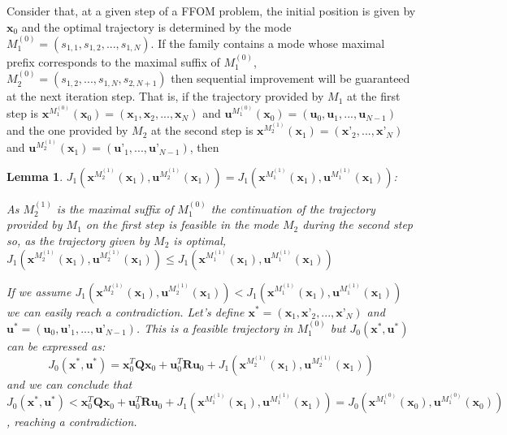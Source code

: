 \documentclass[12,twoside]{TFG-GM}
\newtheorem{lemma}[theorem]{Lemma}
\theoremstyle{definition}
\theoremstyle{remark}
\begin{document}
Consider that, at a given step of a FFOM problem, the initial position is given by $\textbf{x}_0$ and the optimal trajectory is determined by the mode $M_1^{(0)} = (s_{1,1}, s_{1,2}, ..., s_{1,N})$. If the family contains a mode whose maximal prefix corresponds to the maximal suffix of $M_1^{(0)}$, $M_2^{(0)} = (s_{1,2}, ..., s_{1,N}, s_{2,N+1} )$ then sequential improvement will be guaranteed at the next iteration step. That is, if the trajectory provided by $M_1$ at the first step is $\textbf{x}^{M_1^{(0)}}(\textbf{x}_0) = (\textbf{x}_1, \textbf{x}_2, ..., \textbf{x}_N)$ and $\textbf{u}^{M_1^{(0)}}(\textbf{x}_0) = (\textbf{u}_0, \textbf{u}_1, ..., \textbf{u}_{N-1})$ and the one provided by $M_2$ at the second step is $\textbf{x}^{M_2^{(1)}}(\textbf{x}_1) = (\textbf{x'}_2, ..., \textbf{x'}_N)$ and $\textbf{u}^{M_2^{(1)}}(\textbf{x}_1) = (\textbf{u'}_1, ..., \textbf{u'}_{N-1})$, then

\begin{lemma} \label{lem:seq_imp} {$J_1(\textbf{x}^{M_2^{(1)}}(\textbf{x}_1),\textbf{u}^{M_2^{(1)}}(\textbf{x}_1)) = J_1(\textbf{x}^{M_1^{(1)}}(\textbf{x}_1),\textbf{u}^{M_1^{(1)}}(\textbf{x}_1))$:}


As $M_2^{(1)}$ is the maximal suffix of $M_1^{(0)}$ the continuation of the trajectory provided by $M_1$ on the first step is feasible in the mode $M_2$ during the second step so, as the trajectory given by $M_2$ is optimal, $J_1(\textbf{x}^{M_2^{(1)}}(\textbf{x}_1),\textbf{u}^{M_2^{(1)}}(\textbf{x}_1)) \leq J_1(\textbf{x}^{M_1^{(1)}}(\textbf{x}_1),\textbf{u}^{M_1^{(1)}}(\textbf{x}_1))$

If we assume $J_1(\textbf{x}^{M_2^{(1)}}(\textbf{x}_1),\textbf{u}^{M_2^{(1)}}(\textbf{x}_1)) < J_1(\textbf{x}^{M_1^{(1)}}(\textbf{x}_1),\textbf{u}^{M_1^{(1)}}(\textbf{x}_1))$ we can easily reach a contradiction. Let's define $\textbf{x}^* = (\textbf{x}_1, \textbf{x'}_2, ..., \textbf{x'}_N)$ and $\textbf{u}^* = (\textbf{u}_0, \textbf{u'}_1, ..., \textbf{u'}_{N-1} )$. This is a feasible trajectory in $M_1^{(0)}$ but $J_0(\textbf{x}^*, \textbf{u}^*)$ can be expressed as: $$J_0(\textbf{x}^*, \textbf{u}^*) = \textbf{x}_0^T \textbf{Q} \textbf{x}_0 + \textbf{u}_0^T \textbf{R} \textbf{u}_0 + J_1(\textbf{x}^{M_2^{(1)}}(\textbf{x}_1),\textbf{u}^{M_2^{(1)}}(\textbf{x}_1))$$ and we can conclude that $J_0(\textbf{x}^*, \textbf{u}^*) < \textbf{x}_0^T \textbf{Q} \textbf{x}_0 + \textbf{u}_0^T \textbf{R} \textbf{u}_0 + J_1(\textbf{x}^{M_1^{(1)}}(\textbf{x}_1),\textbf{u}^{M_1^{(1)}}(\textbf{x}_1)) = J_0(\textbf{x}^{M_1^{(0)}}(\textbf{x}_0),\textbf{u}^{M_1^{(0)}}(\textbf{x}_0))$, reaching a contradiction.
\end{lemma}
\end{document}
